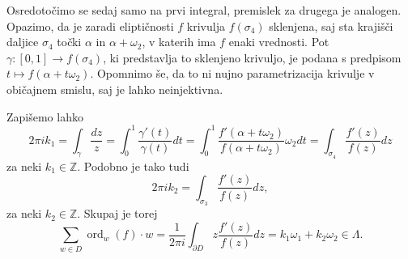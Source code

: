 \documentclass[mat1]{fmfdelo}
\numberwithin{equation}{section}
\newcommand{\Z}{\mathbb Z}
\newcommand{\ord}[2]{\operatorname{ord}_{#1}(#2)}
\theoremstyle{definition}
\begin{document}
\begin{dokaz}
    Osredotočimo se sedaj samo na prvi integral, premislek za drugega je analogen. Opazimo, da je zaradi eliptičnosti $f$ krivulja $f(\sigma_4)$ sklenjena, saj sta krajišči daljice $\sigma_4$ točki $\alpha$ in $\alpha + \omega_2$, v katerih ima $f$ enaki vrednosti. Pot $\gamma : [0,1] \to f(\sigma_4)$, ki predstavlja to sklenjeno krivuljo, je podana s predpisom $t \mapsto f(\alpha + t\omega_2)$. Opomnimo še, da to ni nujno parametrizacija krivulje v običajnem smislu, saj je lahko neinjektivna. 
    
    Zapišemo lahko 
    \[
        2 \pi i k_1 = 
        \int_{\gamma} \frac{dz}{z} = 
        \int_0^1 \frac{\gamma'(t)}{\gamma(t)}dt =
        \int_0^1 \frac{f'(\alpha + t\omega_2)}{f(\alpha + t\omega_2)}\omega_2 dt = 
        \int_{\sigma_4} \frac{f'(z)}{f(z)}dz
    \]
    za neki $k_1 \in \Z$. Podobno je tako tudi
    \[
        2 \pi i k_2 = \int_{\sigma_3} \frac{f'(z)}{f(z)}dz,
    \]
    za neki $k_2 \in \Z$. Skupaj je torej 
    \[
        \sum_{w \in D} \ord{w}{f} \cdot w = 
        \frac{1}{2 \pi i} \int_{\partial D} z\frac{f'(z)}{f(z)}dz = 
        k_1 \omega_1 + k_2 \omega_2\in \Lambda.  
    \]
\end{dokaz}
\end{document}
